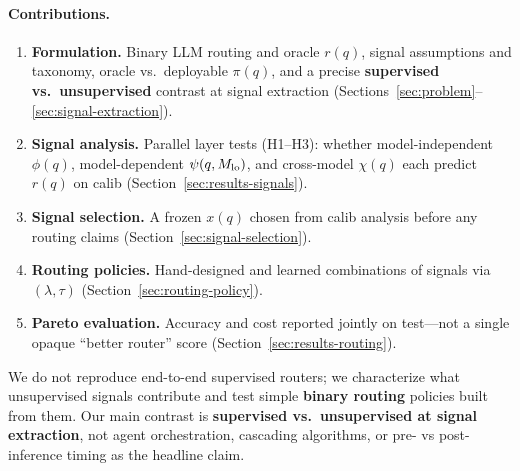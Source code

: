 \paragraph{Contributions.}
\begin{enumerate}
  \item \textbf{Formulation.}
    Binary LLM routing and oracle $r(q)$, signal assumptions and taxonomy, oracle vs.\ deployable $\pi(q)$, and a precise \textbf{supervised vs.\ unsupervised} contrast at signal extraction (Sections~\ref{sec:problem}--\ref{sec:signal-extraction}).
  \item \textbf{Signal analysis.}
    Parallel layer tests (H1--H3): whether model-independent $\phi(q)$, model-dependent $\psi(q,M_{\mathrm{lo}})$, and cross-model $\chi(q)$ each predict $r(q)$ on calib (Section~\ref{sec:results-signals}).
  \item \textbf{Signal selection.}
    A frozen $x(q)$ chosen from calib analysis before any routing claims (Section~\ref{sec:signal-selection}).
  \item \textbf{Routing policies.}
    Hand-designed and learned combinations of signals via $(\lambda,\tau)$ (Section~\ref{sec:routing-policy}).
  \item \textbf{Pareto evaluation.}
    Accuracy and cost reported jointly on test---not a single opaque ``better router'' score (Section~\ref{sec:results-routing}).
\end{enumerate}

We do not reproduce end-to-end supervised routers; we characterize what unsupervised signals contribute and test simple \textbf{binary routing} policies built from them.
Our main contrast is \textbf{supervised vs.\ unsupervised at signal extraction}, not agent orchestration, cascading algorithms, or pre- vs post-inference timing as the headline claim.
